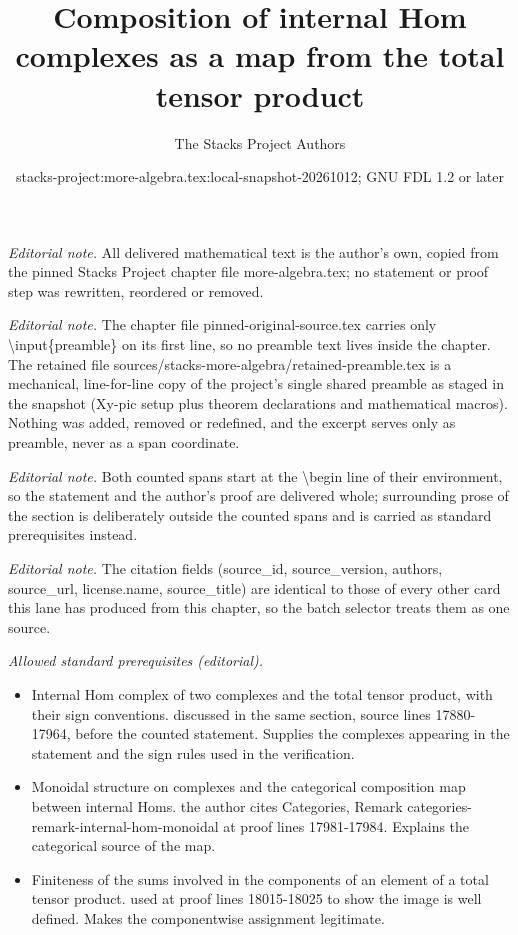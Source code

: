 \documentclass[10pt,a4paper]{amsart}
\title{Composition of internal Hom complexes as a map from the total tensor product}
\author{The Stacks Project Authors}
\date{stacks-project:more-algebra.tex:local-snapshot-20261012; GNU FDL 1.2 or later}
\theoremstyle{plain}
\theoremstyle{definition}
\theoremstyle{remark}
\numberwithin{equation}{subsection}
\begin{document}
\maketitle
\setcounter{subsection}{1}
\noindent\textit{Editorial note.} All delivered mathematical text is the author's own, copied from the pinned Stacks Project chapter file more-algebra.tex; no statement or proof step was rewritten, reordered or removed.\par\medskip
\noindent\textit{Editorial note.} The chapter file pinned-original-source.tex carries only \textbackslash{}input\{preamble\} on its first line, so no preamble text lives inside the chapter. The retained file sources/stacks-more-algebra/retained-preamble.tex is a mechanical, line-for-line copy of the project's single shared preamble as staged in the snapshot (Xy-pic setup plus theorem declarations and mathematical macros). Nothing was added, removed or redefined, and the excerpt serves only as preamble, never as a span coordinate.\par\medskip
\noindent\textit{Editorial note.} Both counted spans start at the \textbackslash{}begin line of their environment, so the statement and the author's proof are delivered whole; surrounding prose of the section is deliberately outside the counted spans and is carried as standard prerequisites instead.\par\medskip
\noindent\textit{Editorial note.} The citation fields (source\_id, source\_version, authors, source\_url, license.name, source\_title) are identical to those of every other card this lane has produced from this chapter, so the batch selector treats them as one source.\par\medskip
\noindent\textit{Allowed standard prerequisites (editorial).}\begin{itemize}
\item Internal Hom complex of two complexes and the total tensor product, with their sign conventions. discussed in the same section, source lines 17880-17964, before the counted statement. Supplies the complexes appearing in the statement and the sign rules used in the verification.
\item Monoidal structure on complexes and the categorical composition map between internal Homs. the author cites Categories, Remark categories-remark-internal-hom-monoidal at proof lines 17981-17984. Explains the categorical source of the map.
\item Finiteness of the sums involved in the components of an element of a total tensor product. used at proof lines 18015-18025 to show the image is well defined. Makes the componentwise assignment legitimate.
\end{itemize}\medskip
\end{document}
